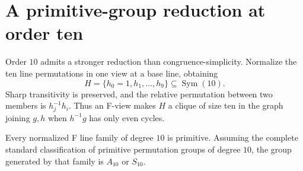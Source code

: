 \section{A primitive-group reduction at order ten}
\label{sec:primitive-degree10}

Order $10$ admits a stronger reduction than congruence-simplicity.
Normalize the ten line permutations in one view at a base line, obtaining
\[
  H=\{h_0=1,h_1,\ldots,h_9\}\subseteq\operatorname{Sym}(10).
\]
Sharp transitivity is preserved, and the relative permutation between two
members is $h_j^{-1}h_i$.  Thus an F-view makes $H$ a clique of size ten in
the graph joining $g,h$ when $h^{-1}g$ has only even cycles.

\begin{computationaltheorem}
\label{cthm:primitive-view}
Every normalized F line family of degree $10$ is primitive.  Assuming the
complete standard classification of primitive permutation groups of degree
$10$, the group generated by that family is $A_{10}$ or $S_{10}$.
\end{computationaltheorem}

